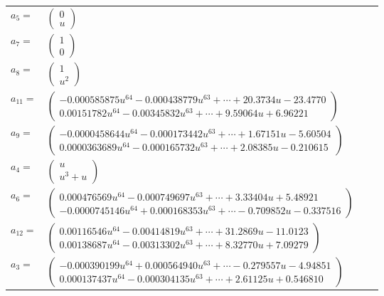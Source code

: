 \documentclass[1p]{elsarticle_modified}
\theoremstyle{definition}
\begin{document}
\begin{tabular}{m{7pt} m{180pt} m{7pt} m{180pt} }
\flushright $a_{5}=$&$\begin{pmatrix}0\\u\end{pmatrix}$ \\
\flushright $a_{7}=$&$\begin{pmatrix}1\\0\end{pmatrix}$ \\
\flushright $a_{8}=$&$\begin{pmatrix}1\\u^2\end{pmatrix}$ \\
\flushright $a_{11}=$&$\begin{pmatrix}-0.000585875 u^{64}-0.000438779 u^{63}+\cdots+20.3734 u-23.4770\\0.00151782 u^{64}-0.00345832 u^{63}+\cdots+9.59064 u+6.96221\end{pmatrix}$ \\
\flushright $a_{9}=$&$\begin{pmatrix}-0.0000458644 u^{64}-0.000173442 u^{63}+\cdots+1.67151 u-5.60504\\0.0000363689 u^{64}-0.000165732 u^{63}+\cdots+2.08385 u-0.210615\end{pmatrix}$ \\
\flushright $a_{4}=$&$\begin{pmatrix}u\\u^3+u\end{pmatrix}$ \\
\flushright $a_{6}=$&$\begin{pmatrix}0.000476569 u^{64}-0.000749697 u^{63}+\cdots+3.33404 u+5.48921\\-0.0000745146 u^{64}+0.000168353 u^{63}+\cdots-0.709852 u-0.337516\end{pmatrix}$ \\
\flushright $a_{12}=$&$\begin{pmatrix}0.00116546 u^{64}-0.00414819 u^{63}+\cdots+31.2869 u-11.0123\\0.00138687 u^{64}-0.00313302 u^{63}+\cdots+8.32770 u+7.09279\end{pmatrix}$ \\
\flushright $a_{3}=$&$\begin{pmatrix}-0.000390199 u^{64}+0.000564940 u^{63}+\cdots-0.279557 u-4.94851\\0.000137437 u^{64}-0.000304135 u^{63}+\cdots+2.61125 u+0.546810\end{pmatrix}$ \\

\end{tabular}
\end{document}
